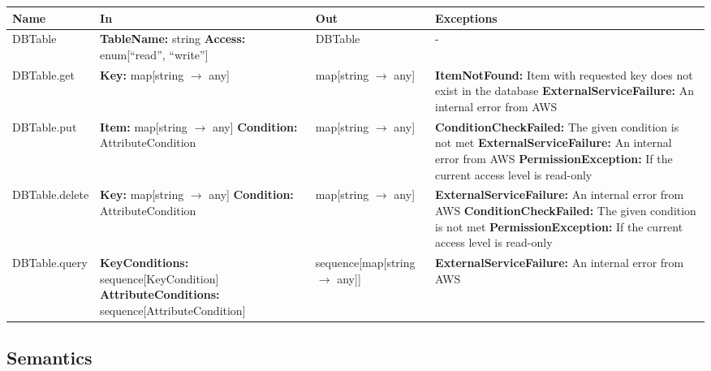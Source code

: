 \documentclass[12pt, titlepage]{article}
\begin{document}
\begin{center}
  \begin{tabular}{>{\raggedright}p{3cm} >{\raggedright}p{5cm}
    >{\raggedright}p{4cm} p{4cm}}
    \hline
    \textbf{Name} & \textbf{In} & \textbf{Out} & \textbf{Exceptions} \\
    \hline
    DBTable & \textbf{TableName:} string \newline \textbf{Access:}
    enum[``read'', ``write''] & DBTable & - \\
    \hline
    DBTable.get & \textbf{Key:} map[string $\rightarrow$ any] &
    map[string $\rightarrow$ any] & \textbf{ItemNotFound:} Item with
    requested key does not exist in the database \newline
    \textbf{ExternalServiceFailure:} An internal error from AWS \\
    \hline
    DBTable.put & \textbf{Item:} map[string $\rightarrow$ any]
    \newline \textbf{Condition:} AttributeCondition & map[string
    $\rightarrow$ any] &
    \textbf{ConditionCheckFailed:} The given condition is not met
    \newline \textbf{ExternalServiceFailure:} An internal error from
    AWS \newline \textbf{PermissionException:} If the current access
    level is read-only \\
    \hline
    DBTable.delete & \textbf{Key:} map[string $\rightarrow$ any]
    \newline \textbf{Condition:} AttributeCondition & map[string
    $\rightarrow$ any] & \textbf{ExternalServiceFailure:} An internal
    error from AWS \newline \textbf{ConditionCheckFailed:} The given
    condition is not met \newline \textbf{PermissionException:} If
    the current access level is read-only \\
    \hline
    DBTable.query & \textbf{KeyConditions:} sequence[KeyCondition]
    \newline \textbf{AttributeConditions:}
    sequence[AttributeCondition] & sequence[map[string $\rightarrow$
    any]] & \textbf{ExternalServiceFailure:} An internal error from AWS \\
    \hline
  \end{tabular}
\end{center}

\subsection{Semantics}
\end{document}
